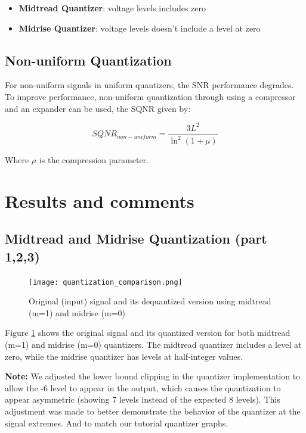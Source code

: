 \documentclass{article}
\begin{document}
\begin{itemize}
    \item \textbf{Midtread Quantizer}: voltage levels includes zero
    \item \textbf{Midrise Quantizer}: voltage levels doesn't include a level at zero
\end{itemize}

\subsection{Non-uniform Quantization}

For non-uniform signals in uniform quantizers, the SNR performance degrades. To improve performance, non-uniform quantization through using a compressor and an expander can be used, the SQNR given by:

$$SQNR_{non-uniform} = \frac{3L^2}{\ln^2(1+\mu)}$$

Where $\mu$ is the compression parameter.

\section{Results and comments}

\subsection{Midtread and Midrise Quantization (part 1,2,3)}

\begin{figure}[H]
    \centering
    \texttt{[image: quantization\_comparison.png]}
    \caption{Original (input) signal and its dequantized version using midtread (m=1) and midrise (m=0)}
    \label{fig:midtread_midrise}
\end{figure}


Figure \ref{fig:midtread_midrise} shows the original signal and its quantized version for both midtread (m=1) and midrise (m=0) quantizers. The midtread quantizer includes a level at zero, while the midrise quantizer has levels at half-integer values.

\textbf{Note:} We adjusted the lower bound clipping in the quantizer implementation to allow the -6 level to appear in the output, which causes the quantization to appear asymmetric (showing 7 levels instead of the expected 8 levels). This adjustment was made to better demonstrate the behavior of the quantizer at the signal extremes. And to match our tutorial quantizer graphs.
\end{document}
